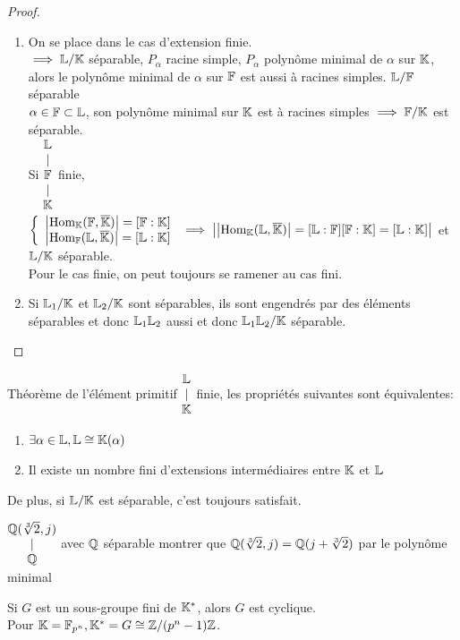 \documentclass[]{report}
\begin{document}
    \begin{proof}
        \begin{enumerate}
            \item On se place dans le cas d'extension finie. \\
            $\implies \mathbb{L}/\mathbb{K}$ séparable, $P_\alpha$ racine simple, $P_\alpha$ polynôme minimal de $\alpha$ sur $\mathbb{K}$, alors le polynôme minimal de $\alpha$ sur $\mathbb{F}$ est aussi à racines simples. $\mathbb{L}/\mathbb{F}$ séparable\\
            $\alpha \in \mathbb{F}\subset \mathbb{L}$, son polynôme minimal sur $\mathbb{K}$ est à racines simples $\implies \mathbb{F}/\mathbb{K}$ est séparable.\\
            Si $\begin{matrix} \begin{matrix} \mathbb{L}\\ |\\ \mathbb{F} \end{matrix}\\ |\\ \mathbb{K} \end{matrix}$ finie, $\left\{\begin{array}{ll} \left|\text{Hom}_{\mathbb{K}}(\mathbb{F},\overline{\mathbb{K}})\right|=[\mathbb{F}:\mathbb{K}]\\\left|\text{Hom}_{\mathbb{F}}(\mathbb{L},\overline{\mathbb{K}})\right|=[\mathbb{L}:\mathbb{K}] \end{array} \right.\implies \left|\left|\text{Hom}_{\mathbb{K}}(\mathbb{L},\overline{\mathbb{K}})\right|=[\mathbb{L}:\mathbb{F}][\mathbb{F}:\mathbb{K}]=[\mathbb{L}:\mathbb{K}]\right|$ et $\mathbb{L}/\mathbb{K}$ séparable.\\
            Pour le cas finie, on peut toujours se ramener au cas fini.
            \item Si $\mathbb{L}_1/\mathbb{K}$ et $\mathbb{L}_2/\mathbb{K}$ sont séparables, ils sont engendrés par des éléments séparables et donc $\mathbb{L}_1\mathbb{L}_2$ aussi et donc $\mathbb{L}_1\mathbb{L}_2/\mathbb{K}$ séparable.
        \end{enumerate}
    \end{proof}

    \begin{tm}{Théorème de l'élément primitif}{}
        $\begin{matrix} \mathbb{L}\\ |\\ \mathbb{K} \end{matrix}$ finie, les propriétés suivantes sont équivalentes:
        \begin{enumerate}
            \item $\exists \alpha\in \mathbb{L},\mathbb{L}\cong\mathbb{K}(\alpha)$
            \item Il existe un nombre fini d'extensions intermédiaires entre $\mathbb{K}$ et $\mathbb{L}$
        \end{enumerate}
        De plus, si $\mathbb{L}/\mathbb{K}$ est séparable, c'est toujours satisfait.
    \end{tm}

    \begin{ex}{}{}
        $\begin{matrix} \mathbb{Q}(\sqrt[3]{2},j)\\ |\\ \mathbb{Q} \end{matrix}$ avec $\mathbb{Q}$ séparable montrer que $\mathbb{Q}(\sqrt[3]{2},j)=\mathbb{Q}(j+\sqrt[3]{2})$ par le polynôme minimal
    \end{ex}

    \begin{re}{}{}
        Si $G$ est un sous-groupe fini de $\mathbb{K}^*$, alors $G$ est cyclique. \\
        Pour $\mathbb{K}=\mathbb{F}_{p^n}, \mathbb{K}^*=G\cong \mathbb{Z}/(p^n-1)\mathbb{Z}$.
    \end{re}
\end{document}
